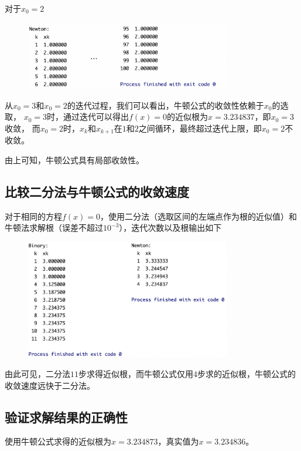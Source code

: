 \documentclass[lang=cn,11pt,a4paper]{elegantpaper}
\begin{document}
对于$x_0=2$
\begin{figure}[htbp]
  \centering
  \includegraphics[width=0.8\textwidth]{image/n2.png}
\end{figure}

从$x_0=3$和$x_0=2$的迭代过程，我们可以看出，牛顿公式的收敛性依赖于$x_0$的选取，
$x_0=3$时，通过迭代可以得出$f(x)=0$的近似根为$x=3.234837$，即$x_0=3$收敛，
而$x_0=2$时，$x_k$和$x_{k+1}$在$1$和$2$之间循环，最终超过迭代上限，即$x_0=2$不收敛。

由上可知，牛顿公式具有局部收敛性。

\subsection{比较二分法与牛顿公式的收敛速度}
对于相同的方程$f(x)=0$，使用二分法（选取区间的左端点作为根的近似值）和牛顿法求解根（误差不超过$10^{-3}$），迭代次数以及根输出如下

\clearpage

\begin{figure}[htbp]
  \centering
  \includegraphics[width=0.8\textwidth]{image/bn.png}
\end{figure}

由此可见，二分法$11$步求得近似根，而牛顿公式仅用$4$步求的近似根，牛顿公式的收敛速度远快于二分法。

\subsection{验证求解结果的正确性}
使用牛顿公式求得的近似根为$x=3.234873$，真实值为$x=3.234836$。
\end{document}
